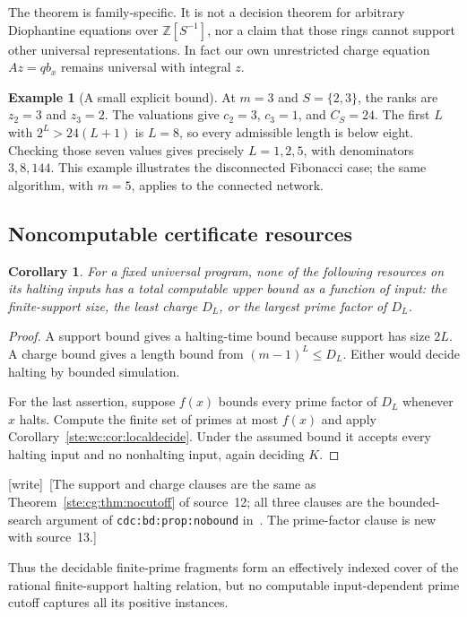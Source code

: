 \documentclass[11pt,letterpaper]{article}
\newtheorem{corollary}[theorem]{Corollary}
\theoremstyle{definition}
\newtheorem{example}[theorem]{Example}
\theoremstyle{remark}
\newcommand{\Z}{\mathbb Z}
\newcommand{\wtag}{\textup{[write]}}
\begin{document}
The theorem is family-specific. It is not a decision theorem for arbitrary
Diophantine equations over $\Z[S^{-1}]$, nor a claim that those rings cannot
support other universal representations. In fact our own unrestricted
charge equation $Az=qb_x$ remains universal with integral $z$.

\begin{example}[A small explicit bound]
At $m=3$ and $S=\{2,3\}$, the ranks are $z_2=3$ and $z_3=2$.
The valuations give $c_2=3$, $c_3=1$, and $C_S=24$. The first $L$ with
$2^L>24(L+1)$ is $L=8$, so every admissible length is below eight.
Checking those seven values gives precisely $L=1,2,5$, with denominators
$3,8,144$. This example illustrates the disconnected Fibonacci case;
the same algorithm, with $m=5$, applies to the connected network.
\end{example}

\subsection{Noncomputable certificate resources}
\begin{corollary}\label{ste:wc:cor:nobound}
For a fixed universal program, none of the following resources on its
halting inputs has a total computable upper bound as a function of input:
the finite-support size, the least charge $D_L$, or the largest prime factor
of $D_L$.
\end{corollary}
\begin{proof}
A support bound gives a halting-time bound because support has size $2L$.
A charge bound gives a length bound from $(m-1)^L\leq D_L$.
Either would decide halting by bounded simulation.

For the last assertion, suppose $f(x)$ bounds every prime factor of $D_L$
whenever $x$ halts. Compute the finite set of primes at most $f(x)$ and
apply Corollary~\ref{ste:wc:cor:localdecide}. Under the assumed bound it accepts every
halting input and no nonhalting input, again deciding $K$.
\end{proof}

\wtag\ [The support and charge clauses are the same as Theorem~\ref{ste:cg:thm:nocutoff} of source~12; all three clauses are the bounded-search argument of \texttt{cdc:bd:prop:nobound} in~\cite{cdc}. The prime-factor clause is new with source~13.]


Thus the decidable finite-prime fragments form an effectively indexed
cover of the rational finite-support halting relation, but no computable
input-dependent prime cutoff captures all its positive instances.
\end{document}
